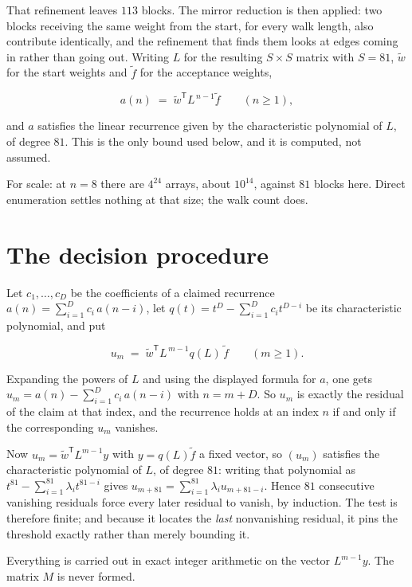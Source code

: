\documentclass[11pt]{article}
\theoremstyle{definition}
\begin{document}
That refinement leaves $113$ blocks. The mirror reduction is then applied: two blocks receiving the same weight from the start, for every walk length, also contribute identically, and the refinement that finds them looks at edges coming in rather than going out. Writing $L$ for the resulting $S \times S$ matrix with $S = 81$, $\tilde w$ for the start weights and $\tilde f$ for the acceptance weights,

\[a(n) \;=\; \tilde w^{\mathsf T} L^{\,n-1} \tilde f \qquad (n \ge 1),\]

and $a$ satisfies the linear recurrence given by the characteristic polynomial of $L$, of degree $81$. This is the only bound used below, and it is computed, not assumed.

For scale: at $n = 8$ there are $4^{24}$ arrays, about $10^{14}$, against $81$ blocks here. Direct enumeration settles nothing at that size; the walk count does.

\section{The decision procedure}

Let $c_1,\dots,c_D$ be the coefficients of a claimed recurrence $a(n) = \sum_{i=1}^{D} c_i\,a(n-i)$, let $q(t) = t^{D} - \sum_{i=1}^{D} c_i t^{D-i}$ be its characteristic polynomial, and put

\[u_m \;=\; \tilde w^{\mathsf T} L^{\,m-1} q(L)\,\tilde f \qquad (m \ge 1).\]

Expanding the powers of $L$ and using the displayed formula for $a$, one gets $u_m = a(n) - \sum_{i=1}^{D} c_i\,a(n-i)$ with $n = m + D$. So $u_m$ is exactly the residual of the claim at that index, and the recurrence holds at an index $n$ if and only if the corresponding $u_m$ vanishes.

Now $u_m = \tilde w^{\mathsf T} L^{m-1} y$ with $y = q(L)\tilde f$ a fixed vector, so $(u_m)$ satisfies the characteristic polynomial of $L$, of degree $81$: writing that polynomial as $t^{81} - \sum_{i=1}^{81} \lambda_i t^{81-i}$ gives $u_{m+81} = \sum_{i=1}^{81} \lambda_i u_{m+81-i}$. Hence $81$ consecutive vanishing residuals force every later residual to vanish, by induction. The test is therefore finite; and because it locates the {\itshape last} nonvanishing residual, it pins the threshold exactly rather than merely bounding it.

Everything is carried out in exact integer arithmetic on the vector $L^{m-1}y$. The matrix $M$ is never formed.
\end{document}
